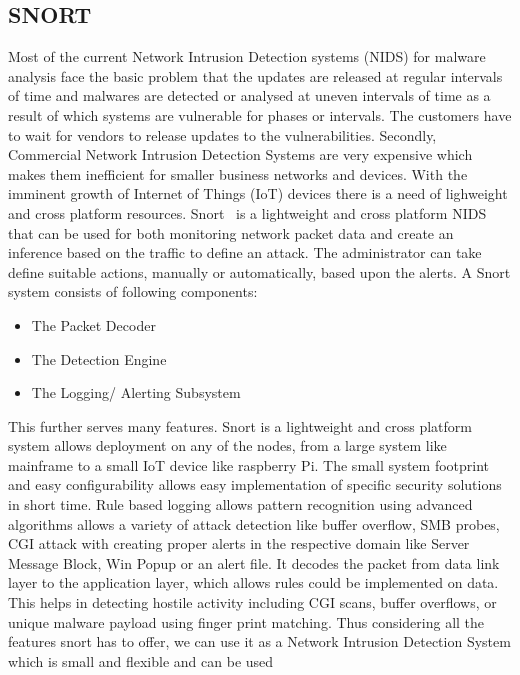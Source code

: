 \documentclass[11pt]{article}
\begin{document}
	\subsection{SNORT}
	Most of the current Network Intrusion Detection systems (NIDS) for malware analysis face the basic problem that the updates are released at regular intervals of time and malwares are detected or analysed at uneven intervals of time as a result of which systems are vulnerable for phases or intervals. The customers have to wait for vendors to release updates to the vulnerabilities. Secondly, Commercial Network Intrusion Detection Systems are very expensive which makes them inefficient for smaller business networks and devices. With the imminent growth of Internet of Things (IoT) devices there is a need of lighweight and cross platform resources.
	Snort~\cite{roesch1999snort} is a lightweight and cross platform NIDS that can be used for both monitoring network packet data and create an inference based on the traffic to define an attack. The administrator can take define suitable actions, manually or automatically, based upon the alerts.
	A Snort system consists of following components:
	\begin{itemize}
		\item The Packet Decoder
		\item The Detection Engine
		\item The Logging/ Alerting Subsystem
	\end{itemize}
	This further serves many features. Snort is a lightweight and cross platform system allows deployment on any of the nodes, from a large system like mainframe to a small IoT device like raspberry Pi. The small system footprint and easy configurability allows easy implementation of specific security solutions in short time. Rule based logging allows pattern recognition using advanced algorithms allows a variety of attack detection like buffer overflow, SMB probes, CGI attack with creating proper alerts in the respective domain like Server Message Block, Win Popup or an alert file. It decodes the packet from data link layer to the application layer, which allows rules could be implemented on data. This helps in detecting hostile activity including CGI scans, buffer overflows, or unique malware payload using finger print matching.
	Thus considering all the features snort has to offer, we can use it as a Network Intrusion Detection System which is small and flexible and can be used
	
\end{document}
